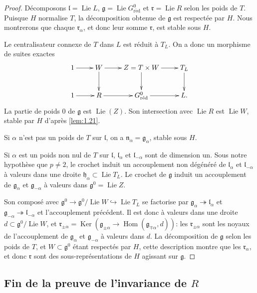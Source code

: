 \documentclass[11pt,a4paper]{article}
\theoremstyle{plain}
\theoremstyle{definition}
\DeclareMathOperator{\Hom}{Hom}
\DeclareMathOperator{\Ker}{Ker}
\DeclareMathOperator{\Lie}{Lie}
\newcommand{\red}{\mathrm{r\acute{e}d}}
\begin{document}
\begin{proof}
D\'ecomposons $\mathfrak{l} = \Lie L$, $\mathfrak{g} = \Lie G^0_\red$ et $\mathfrak{r} = \Lie R$ selon les poids de $T$. Puisque $H$ normalise $T$, la d\'ecomposition obtenue de $\mathfrak{g}$ est respect\'ee par $H$. Nous montrerons que chaque $\mathfrak{r}_\alpha$, et donc leur somme $\mathfrak{r}$, est stable sous $H$.

Le centralisateur connexe de $T$ dans $L$ est r\'eduit \`a $T_L$. On a donc un morphisme de suites exactes
\[
\xymatrix{
1 \ar[r] & W \ar[r] \ar[d] & Z = T \times W \ar[r] \ar[d] & T_L \ar[d] \\
1 \ar[r] & R \ar[r] & G^0_\red \ar[r] & L.
}
\]
La partie de poids $0$ de $\mathfrak{g}$ est $\Lie(Z)$. Son intersection avec $\Lie R$ est $\Lie W$, stable par $H$ d'apr\`es \ref{lem:1.21}.

Si $\alpha$ n'est pas un poids de $T$ sur $\mathfrak{l}$, on a $\mathfrak{n}_\alpha = \mathfrak{g}_\alpha$, stable sous $H$.

Si $\alpha$ est un poids non nul de $T$ sur $\mathfrak{l}$, $\mathfrak{l}_\alpha$ et $\mathfrak{l}_{-\alpha}$ sont de dimension un. Sous notre hypoth\`ese que $p \neq 2$, le crochet induit un accouplement non d\'eg\'en\'er\'e de $\mathfrak{l}_\alpha$ et $\mathfrak{l}_{-\alpha}$ \`a valeurs dans une droite $\mathfrak{h}_\alpha \subset \Lie T_L$. Le crochet de $\mathfrak{g}$ induit un accouplement de $\mathfrak{g}_\alpha$ et $\mathfrak{g}_{-\alpha}$ \`a valeurs dans $\mathfrak{g}^0 = \Lie Z$.

Son compos\'e avec $\mathfrak{g}^0 \to \mathfrak{g}^0/\Lie W \hookrightarrow \Lie T_L$ se factorise par $\mathfrak{g}_\alpha \twoheadrightarrow \mathfrak{l}_\alpha$ et $\mathfrak{g}_{-\alpha} \twoheadrightarrow \mathfrak{l}_{-\alpha}$ et l'accouplement pr\'ec\'edent. Il est donc \`a valeurs dans une droite $d \subset \mathfrak{g}^0/\Lie W$, et $\mathfrak{r}_{\pm\alpha} = \Ker(\mathfrak{g}_{\pm\alpha} \to \Hom(\mathfrak{g}_{\mp\alpha}, d))$: les $\mathfrak{r}_{\pm\alpha}$ sont les noyaux de l'accouplement de $\mathfrak{g}_\alpha$ et $\mathfrak{g}_{-\alpha}$ \`a valeurs dans $d$. La d\'ecomposition de $\mathfrak{g}$ selon les poids de $T$, et $W \subset \mathfrak{g}^0$ \'etant respect\'es par $H$, cette description montre que les $\mathfrak{r}_\alpha$, et donc $\mathfrak{r}$ sont des sous-repr\'esentations de $H$ agissant sur $\mathfrak{g}$.
\end{proof}

\subsection{Fin de la preuve de l'invariance de $R$}\label{sec:1.23}
\end{document}
